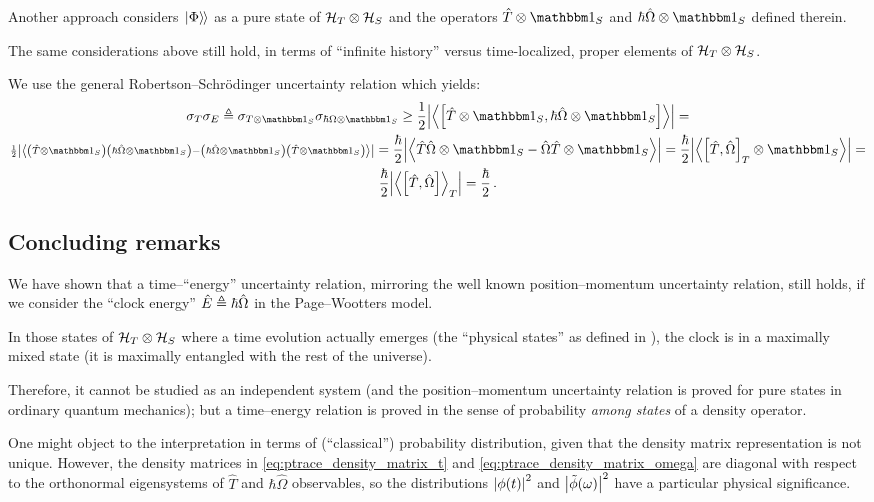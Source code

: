 Another approach considers $\left.\left| \Phi \right\rangle\hspace{-0.115em}\right\rangle$ as a pure state of $\mathcal{H}_T \otimes \mathcal{H}_S$
and the operators $\hat{T} \ox \idop_{S}$ and $\hbar\hat{\Omega} \ox \idop_{S}$
defined therein.

The same considerations above still hold, in terms of ``infinite history'' versus
time-localized, proper elements of $\mathcal{H}_T \otimes \mathcal{H}_S$. 

We use the general Robertson--Schr\"{o}dinger uncertainty relation which yields:
\begin{multline}
  \sigma_T \sigma_E \eqbydef
  \sigma_{T \ox \idop_S} \sigma_{\hbar\Omega \ox \idop_S} \geq
  \frac{1}{2} \abs{\expval{\comm
    {\hat{T}\ox\idop_S} {\hbar\hat{\Omega}\ox\idop_S}
  }} =
  \\
  {\scriptstyle
    \frac{1}{2} \abs{\expval{
      \qty(\hat{T}\ox\idop_S) \qty(\hbar\hat{\Omega}\ox\idop_S) -
      \qty(\hbar\hat{\Omega}\ox\idop_S) \qty(\hat{T}\ox\idop_S)
    }}
  } =
  \frac{\hbar}{2} \abs{\expval{
    \hat{T}\hat{\Omega}\ox\idop_S - \hat{\Omega}\hat{T}\ox\idop_S
  }} =
  \frac{\hbar}{2} \abs{\expval{
    \comm{\hat{T}}{\hat{\Omega}}_T \ox \idop_S
  }} =
  \\
  \frac{\hbar}{2} \abs{\expval{\comm
    {\hat{T}}{\hat{\Omega}}
  }_T} =
  \frac{\hbar}{2}
  \,\text{.}
\end{multline}

\subsection*{Concluding remarks}

We have shown that a time--``energy'' uncertainty relation,
mirroring the well known position--momentum uncertainty relation,
still holds, if we consider the ``clock energy'' $\hat{E} \triangleq \hbar\hat{\Omega}$
in the Page--Wootters model.

In those states of $\mathcal{H}_T \otimes \mathcal{H}_S$ where a time evolution actually emerges
(the ``physical states'' as defined in \cite{Lloyd:Time}),
the clock is in a maximally mixed state
(it is maximally entangled with the rest of the universe).

Therefore, it cannot be studied as an independent system
(and the position--momentum uncertainty relation is proved
for pure states in ordinary quantum mechanics); but a
time--energy relation is proved in the sense of probability
\emph{among states} of a density operator.

One might object to the interpretation in terms of (``classical'')
probability distribution, given
that the density matrix representation is
not unique.
However, the density matrices
in \eqref{eq:ptrace_density_matrix_t} and \eqref{eq:ptrace_density_matrix_omega}
are diagonal with respect to
the orthonormal eigensystems of $\hat{T}$ and $\hbar \hat{\Omega}$ observables,
so the distributions $\abs{\phi(t)}^2$ and $\abs{\tilde{\phi}(\omega)}^2$
have a particular physical significance.

